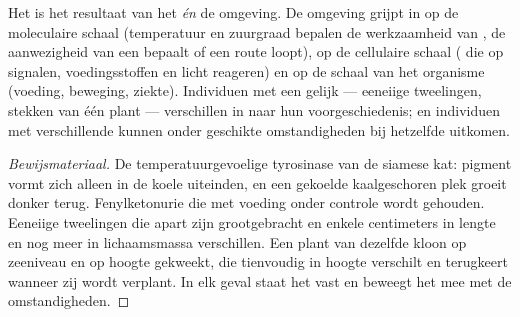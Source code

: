 \begin{proposition}\label{prop:g11:enzymes-and-phenotype:environment}
Het  is het resultaat van het  \emph{én} de omgeving. De
omgeving grijpt in op de moleculaire schaal (temperatuur en zuurgraad
bepalen de werkzaamheid van , de aanwezigheid van een 
bepaalt of een route loopt), op de cellulaire schaal ( die op
signalen, voedingsstoffen en licht reageren) en op de schaal van het
organisme (voeding, beweging, ziekte). Individuen met een gelijk 
--- eeneiige tweelingen, stekken van één plant --- verschillen in
 naar hun voorgeschiedenis; en individuen met verschillende
 kunnen onder geschikte omstandigheden bij hetzelfde 
uitkomen.
\end{proposition}
\begin{proof}[Bewijsmateriaal]
De temperatuurgevoelige tyrosinase van de siamese kat: pigment vormt zich
alleen in de koele uiteinden, en een gekoelde kaalgeschoren plek groeit
donker terug. Fenylketonurie die met voeding onder controle wordt
gehouden. Eeneiige tweelingen die apart zijn grootgebracht en enkele
centimeters in lengte en nog meer in lichaamsmassa verschillen. Een plant
van dezelfde kloon op zeeniveau en op hoogte gekweekt, die tienvoudig in
hoogte verschilt en terugkeert wanneer zij wordt verplant. In elk geval
staat het  vast en beweegt het  mee met de
omstandigheden.
\end{proof}

